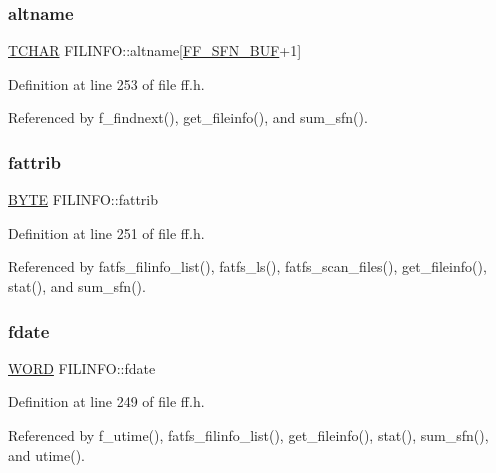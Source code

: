 \subsubsection{\texorpdfstring{altname}{altname}}
{\footnotesize\ttfamily \hyperlink{ff_8h_a03bdb8ce5895c7e261aadc2529637546}{T\+C\+H\+AR} F\+I\+L\+I\+N\+F\+O\+::altname\mbox{[}\hyperlink{ffconf_8h_ac19c6abcf1fc6e2bbf204003462cfedb}{F\+F\+\_\+\+S\+F\+N\+\_\+\+B\+UF}+1\mbox{]}}



Definition at line 253 of file ff.\+h.



Referenced by f\+\_\+findnext(), get\+\_\+fileinfo(), and sum\+\_\+sfn().

\mbox{\label{structFILINFO_a838d542585831b085537b363f18205c0}} 
\subsubsection{\texorpdfstring{fattrib}{fattrib}}
{\footnotesize\ttfamily \hyperlink{ff_8h_a4ae1dab0fb4b072a66584546209e7d58}{B\+Y\+TE} F\+I\+L\+I\+N\+F\+O\+::fattrib}



Definition at line 251 of file ff.\+h.



Referenced by fatfs\+\_\+filinfo\+\_\+list(), fatfs\+\_\+ls(), fatfs\+\_\+scan\+\_\+files(), get\+\_\+fileinfo(), stat(), and sum\+\_\+sfn().

\mbox{\label{structFILINFO_a7c01c48a15b1b49da459924437b0bd52}} 
\subsubsection{\texorpdfstring{fdate}{fdate}}
{\footnotesize\ttfamily \hyperlink{ff_8h_a197942eefa7db30960ae396d68339b97}{W\+O\+RD} F\+I\+L\+I\+N\+F\+O\+::fdate}



Definition at line 249 of file ff.\+h.



Referenced by f\+\_\+utime(), fatfs\+\_\+filinfo\+\_\+list(), get\+\_\+fileinfo(), stat(), sum\+\_\+sfn(), and utime().

